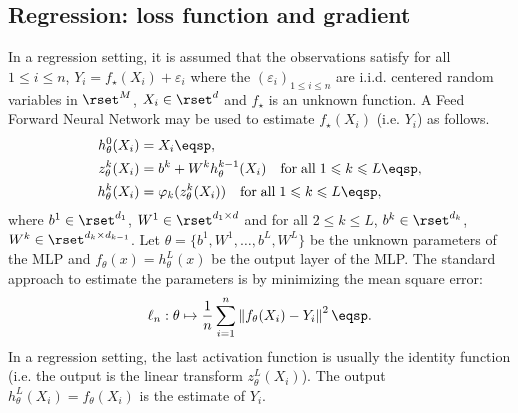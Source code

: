 \subsection{Regression: loss function and gradient}
In a regression setting, it is assumed that the observations satisfy for all $1\leqslant i \leqslant n$, $Y_i = f_\star(X_i) + \varepsilon_i$ where the $(\varepsilon_i)_{1\leqslant i\leqslant n}$ are i.i.d. centered random variables in $\rset^M$, $X_i\in\rset^d$ and $f_{\star}$ is an unknown function.  A Feed Forward Neural Network may be used to estimate $f_\star(X_i)$ (i.e. $Y_i$) as follows. 
\begin{align*}
h_{\theta}^0(X_i) &= X_i\eqsp,\\
z_{\theta}^k(X_i)  &= b^k + W^kh_{\theta}^{k-1}(X_i)\quad \mathrm{for\;all\;} 1\leqslant k\leqslant L\eqsp,\\
h_{\theta}^k(X_i)  &= \varphi_k(z_{\theta}^{k}(X_i))\quad \mathrm{for\;all\;}1\leqslant k\leqslant L\eqsp,
\end{align*}
where $b^1\in\rset^{d_1}$, $W^1\in\rset^{d_1\times d}$ and for all $2\leqslant k\leqslant L$, $b^k\in\rset^{d_k}$, $W^k\in\rset^{d_k\times d_{k-1}}$.  Let $\theta = \{b^1,W^1,\ldots,b^L,W^L\}$ be the unknown parameters of the MLP and $f_{\theta}(x) = h_{\theta}^L(x)$ be the output layer of the MLP. The standard approach to estimate the parameters is by minimizing the mean square error:
$$
\ell_n:\theta \mapsto  \frac{1}{n} \sum_{i=1}^n\left\|f_{\theta}(X_i) - Y_i\right\|^2\eqsp.
$$
In a regression setting, the last activation function is usually the identity function (i.e. the output is the linear transform $z_{\theta}^L(X_i)$). The output $h_{\theta}^L(X_i)= f_{\theta}(X_i) $ is the estimate of $Y_i$.

